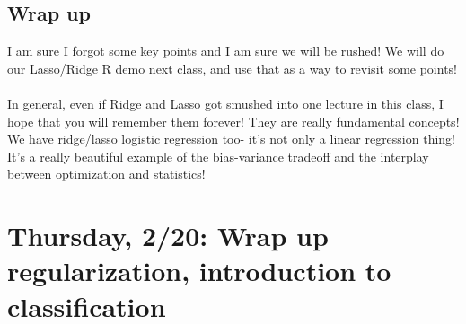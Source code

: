 \subsection{Wrap up}

I am sure I forgot some key points and I am sure we will be rushed! We will do our Lasso/Ridge R demo next class, and use that as a way to revisit some points! \\
\\
In general, even if Ridge and Lasso got smushed into one lecture in this class, I hope that you will remember them forever! They are really fundamental concepts! We have ridge/lasso logistic regression too- it's not only a linear regression thing! It's a really beautiful example of the bias-variance tradeoff and the interplay between optimization and statistics!

\section{Thursday, 2/20: Wrap up regularization, introduction to classification}



